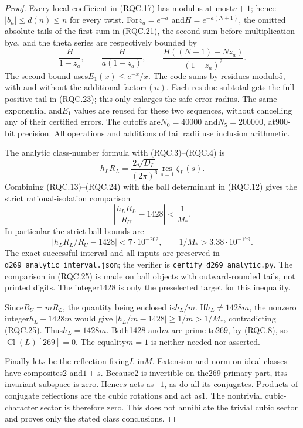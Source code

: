 \begin{proof}
Every local coefficient in (RQC.17) has modulus at most$v+1$;
hence$|b_n|\le d(n)\le n$ for every twist.
For$z_a=e^{-a}$ and$H=e^{-a(N+1)}$, the omitted absolute tails
of the first sum in (RQC.21), the second sum before multiplication
by$a$, and the theta series are respectively bounded by
\[
 \frac H{1-z_a},\qquad
 \frac H{a(1-z_a)},\qquad
 \frac{H((N+1)-Nz_a)}{(1-z_a)^2}.
 \tag{RQC.23}
\]
The second bound uses$E_1(x)\le e^{-x}/x$.
The code sums by residues modulo5, with and without the additional
factor$\tau(n)$.  Each residue subtotal gets the full positive tail
in (RQC.23); this only enlarges the safe error radius.
The same exponential and$E_1$ values are reused for these two
sequences, without cancelling any of their certified errors.
The cutoffs are$N_0=40000$ and$N_5=200000$, at900-bit precision.
All operations and additions of tail radii use inclusion arithmetic.

The analytic class-number formula with (RQC.3)--(RQC.4) is
\[
 h_LR_L=\frac{2\sqrt{D_L}}{(2\pi)^6}
                \operatorname*{res}_{s=1}\zeta_L(s).
 \tag{RQC.24}
\]
Combining (RQC.13)--(RQC.24) with the ball determinant in (RQC.12)
gives the strict rational-isolation comparison
\[
             \left|\frac{h_LR_L}{R_U}-1428\right|<\frac1{M_*}.
 \tag{RQC.25}
\]
In particular the strict ball bounds are
\[
 \left|h_LR_L/R_U-1428\right|<7\cdot10^{-202},\qquad
                   1/M_*>3.38\cdot10^{-179}.
\]
The exact successful interval and all inputs are preserved in
\texttt{d269\_analytic\_interval.json}; the verifier is
\texttt{certify\_d269\_analytic.py}.  The comparison in (RQC.25)
is made on ball objects with outward-rounded tails, not printed digits.
The integer1428 is only the preselected target for this inequality.

Since$R_U=mR_L$, the quantity being enclosed is$h_L/m$.
If$h_L\ne1428m$, the nonzero integer$h_L-1428m$ would give
$|h_L/m-1428|\ge1/m>1/M_*$, contradicting (RQC.25).
Thus$h_L=1428m$.  Both1428 and$m$ are prime to269, by (RQC.8),
so$\operatorname{Cl}(L)[269]=0$.
The equality$m=1$ is neither needed nor asserted.

Finally let$s$ be the reflection fixing$L$ in$M$.
Extension and norm on ideal classes have composites2 and$1+s$.
Because2 is invertible on the269-primary part, its$s$-invariant
subspace is zero.  Hence$s$ acts as$-1$, as do all its conjugates.
Products of conjugate reflections are the cubic rotations and act
as1.  The nontrivial cubic-character sector is therefore zero.
This does not annihilate the trivial cubic sector and proves only
the stated class conclusions.
\end{proof}

